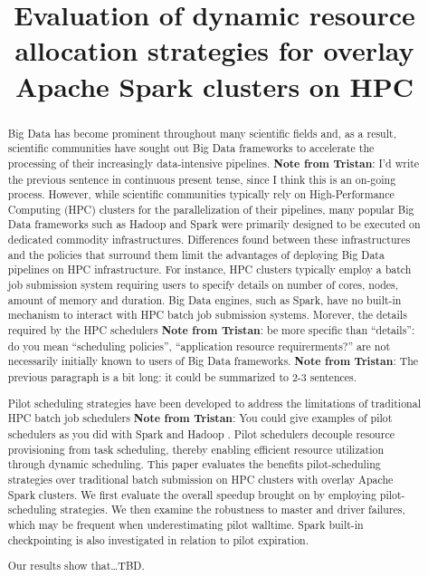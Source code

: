 \documentclass{IEEEtran}
\newcommand{\tristan}[1]{\color{red}\textbf{Note from Tristan}:
      #1 \color{black}}
\newcommand{\TG}[1]{\tristan{#1}}
\begin{document}
\title{Evaluation of dynamic resource allocation strategies for overlay Apache
       Spark clusters on HPC}
\author{
    \IEEEauthorblockA{}
}
\maketitle

\begin{abstract}
    Big Data has become prominent throughout many scientific fields and, as a
    result, scientific communities have sought out Big Data frameworks to 
    accelerate the processing of their increasingly data-intensive pipelines.
    \TG{I'd write the previous sentence in continuous present tense, since I think
    this is an on-going process.}
    However, while scientific communities typically rely on High-Performance 
    Computing (HPC) clusters for the parallelization of their pipelines, many 
    popular Big Data frameworks such as Hadoop and Spark were primarily designed
    to be executed on dedicated commodity infrastructures. Differences found between
    these infrastructures and the policies that surround them limit the advantages
    of deploying Big Data pipelines on HPC infrastructure. For instance, HPC
    clusters typically employ a batch job submission system requiring users to
    specify details on number of cores, nodes, amount of memory and duration.
    Big Data engines, such as Spark, have no built-in mechanism to interact with
    HPC batch job submission systems. Morever, the details required by the HPC
    schedulers \TG{be more specific than ``details'': do you mean ``scheduling policies'',
    ``application resource requirerments?''
    } are not necessarily initially known to users of Big Data frameworks.
    \TG{The previous paragraph is a bit long: it could be summarized to 2-3
    sentences.}

    Pilot scheduling strategies have been developed to address the limitations 
    of traditional HPC batch job schedulers \TG{You could give examples of pilot schedulers as you did with Spark and Hadoop}.
    Pilot schedulers decouple resource
    provisioning from task scheduling, thereby enabling efficient resource
    utilization through dynamic scheduling. This paper evaluates the benefits 
    pilot-scheduling strategies over traditional batch submission
    on HPC clusters with overlay Apache Spark clusters. We first evaluate the
    overall speedup brought on by employing pilot-scheduling strategies. We then
    examine the robustness to master and driver failures, which may be frequent 
    when underestimating pilot walltime. Spark built-in checkpointing is also 
    investigated in relation to pilot expiration.

    Our results show that\ldots TBD.
\end{abstract}
\end{document}
